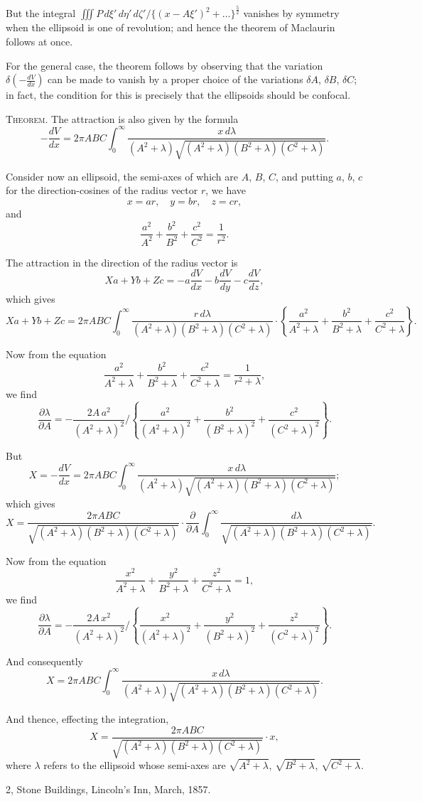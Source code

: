 \documentclass[12pt,a4paper]{article}
\theoremstyle{plain}
\begin{document}
But the integral $\iiint P\, d\xi'\, d\eta'\, d\zeta' / \{(x-A\xi')^2 + \ldots\}^{\frac{5}{2}}$ vanishes by symmetry when the ellipsoid is one of revolution; and hence the theorem of Maclaurin follows at once.

For the general case, the theorem follows by observing that the variation $\delta(-\frac{dV}{dx})$ can be made to vanish by a proper choice of the variations $\delta A$, $\delta B$, $\delta C$; in fact, the condition for this is precisely that the ellipsoids should be confocal.

\textsc{Theorem.} The attraction is also given by the formula
\[
-\frac{dV}{dx} = 2\pi ABC \int_0^{\infty} \frac{x\, d\lambda}{(A^2+\lambda)\sqrt{(A^2+\lambda)(B^2+\lambda)(C^2+\lambda)}}.
\]

Consider now an ellipsoid, the semi-axes of which are $A$, $B$, $C$, and putting $a$, $b$, $c$ for the direction-cosines of the radius vector $r$, we have
\[
x = ar, \quad y = br, \quad z = cr,
\]
and
\[
\frac{a^2}{A^2} + \frac{b^2}{B^2} + \frac{c^2}{C^2} = \frac{1}{r^2}.
\]

The attraction in the direction of the radius vector is
\[
Xa + Yb + Zc = -a\frac{dV}{dx} - b\frac{dV}{dy} - c\frac{dV}{dz},
\]
which gives
\[
Xa + Yb + Zc = 2\pi ABC \int_0^{\infty} \frac{r\, d\lambda}{(A^2+\lambda)(B^2+\lambda)(C^2+\lambda)} \cdot \left\{\frac{a^2}{A^2+\lambda} + \frac{b^2}{B^2+\lambda} + \frac{c^2}{C^2+\lambda}\right\}.
\]

Now from the equation
\[
\frac{a^2}{A^2+\lambda} + \frac{b^2}{B^2+\lambda} + \frac{c^2}{C^2+\lambda} = \frac{1}{r^2+\lambda},
\]
we find
\[
\frac{\partial\lambda}{\partial A} = -\frac{2A\, a^2}{(A^2+\lambda)^2} \Big/ \left\{\frac{a^2}{(A^2+\lambda)^2} + \frac{b^2}{(B^2+\lambda)^2} + \frac{c^2}{(C^2+\lambda)^2}\right\}.
\]

But
\[
X = -\frac{dV}{dx} = 2\pi ABC \int_0^{\infty} \frac{x\, d\lambda}{(A^2+\lambda)\sqrt{(A^2+\lambda)(B^2+\lambda)(C^2+\lambda)}};
\]
which gives
\[
X = \frac{2\pi ABC}{\sqrt{(A^2+\lambda)(B^2+\lambda)(C^2+\lambda)}} \cdot \frac{\partial}{\partial A} \int_0^{\infty} \frac{d\lambda}{\sqrt{(A^2+\lambda)(B^2+\lambda)(C^2+\lambda)}}.
\]

Now from the equation
\[
\frac{x^2}{A^2+\lambda} + \frac{y^2}{B^2+\lambda} + \frac{z^2}{C^2+\lambda} = 1,
\]
we find
\[
\frac{\partial\lambda}{\partial A} = -\frac{2A\, x^2}{(A^2+\lambda)^2} \Big/ \left\{\frac{x^2}{(A^2+\lambda)^2} + \frac{y^2}{(B^2+\lambda)^2} + \frac{z^2}{(C^2+\lambda)^2}\right\}.
\]

And consequently
\[
X = 2\pi ABC \int_0^{\infty} \frac{x\, d\lambda}{(A^2+\lambda)\sqrt{(A^2+\lambda)(B^2+\lambda)(C^2+\lambda)}}.
\]

And thence, effecting the integration,
\[
X = \frac{2\pi ABC}{\sqrt{(A^2+\lambda)(B^2+\lambda)(C^2+\lambda)}} \cdot x,
\]
where $\lambda$ refers to the ellipsoid whose semi-axes are $\sqrt{A^2+\lambda}$, $\sqrt{B^2+\lambda}$, $\sqrt{C^2+\lambda}$.

\begin{flushright}
2, Stone Buildings, Lincoln's Inn, March, 1857.
\end{flushright}

\clearpage
\end{document}

